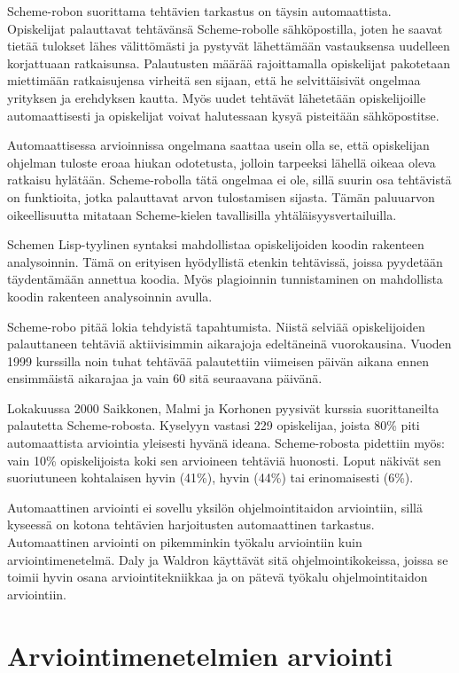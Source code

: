 \documentclass[finnish]{../tktltiki2}
\theoremstyle{definition}
\theoremstyle{remark}
\begin{document}
Scheme-robon suorittama tehtävien tarkastus on täysin automaattista. Opiskelijat palauttavat tehtävänsä Scheme-robolle sähköpostilla, joten he saavat tietää tulokset lähes välittömästi ja pystyvät lähettämään vastauksensa uudelleen korjattuaan ratkaisunsa. Palautusten määrää rajoittamalla opiskelijat pakotetaan miettimään ratkaisujensa virheitä sen sijaan, että he selvittäisivät ongelmaa yrityksen ja erehdyksen kautta. Myös uudet tehtävät lähetetään opiskelijoille automaattisesti ja opiskelijat voivat halutessaan kysyä pisteitään sähköpostitse.

Automaattisessa arvioinnissa ongelmana saattaa usein olla se, että opiskelijan ohjelman tuloste eroaa hiukan odotetusta, jolloin tarpeeksi lähellä oikeaa oleva ratkaisu hylätään. Scheme-robolla tätä ongelmaa ei ole, sillä suurin osa tehtävistä on funktioita, jotka palauttavat arvon tulostamisen sijasta. Tämän paluuarvon oikeellisuutta mitataan Scheme-kielen tavallisilla yhtäläisyysvertailuilla.

Schemen Lisp-tyylinen syntaksi mahdollistaa opiskelijoiden koodin rakenteen analysoinnin. Tämä on erityisen hyödyllistä etenkin tehtävissä, joissa pyydetään täydentämään annettua koodia. Myös plagioinnin tunnistaminen on mahdollista koodin rakenteen analysoinnin avulla.

Scheme-robo pitää lokia tehdyistä tapahtumista. Niistä selviää opiskelijoiden palauttaneen tehtäviä aktiivisimmin aikarajoja edeltäneinä vuorokausina. Vuoden 1999 kurssilla noin tuhat tehtävää palautettiin viimeisen päivän aikana ennen ensimmäistä aikarajaa ja vain 60 sitä seuraavana päivänä.

Lokakuussa 2000 Saikkonen, Malmi ja Korhonen pyysivät kurssia suorittaneilta palautetta Scheme-robosta. Kyselyyn vastasi 229 opiskelijaa, joista 80\% piti automaattista arviointia yleisesti hyvänä ideana. Scheme-robosta pidettiin myös: vain 10\% opiskelijoista koki sen arvioineen tehtäviä huonosti. Loput näkivät sen suoriutuneen kohtalaisen hyvin (41\%), hyvin (44\%) tai erinomaisesti (6\%).

Automaattinen arviointi ei sovellu yksilön ohjelmointitaidon arviointiin, sillä kyseessä on kotona tehtävien harjoitusten automaattinen tarkastus. Automaattinen arviointi on pikemminkin työkalu arviointiin kuin arviointimenetelmä. Daly ja Waldron käyttävät sitä ohjelmointikokeissa, joissa se toimii hyvin osana arviointitekniikkaa ja on pätevä työkalu ohjelmointitaidon arviointiin.

\section{Arviointimenetelmien arviointi}
\end{document}
